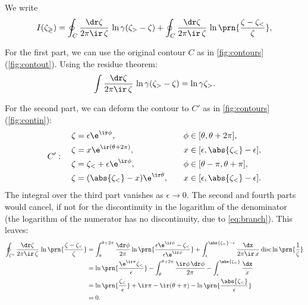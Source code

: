 \documentclass[12pt]{article}
\begin{document}
We write
%
\begin{equation}\label{eq:contoursplit}
  I(\zeta_\gtrless) = \oint_C \frac{\dr\zeta}{2\pi\ir\,\zeta}\, \ln\gamma(\zeta_>-\zeta) + \oint_C \frac{\dr\zeta}{2\pi\ir\,\zeta}\, \ln\prn{\frac{\zeta-\zeta_<}{\zeta}},
\end{equation}
%

For the first part, we can use the original contour $C$ as in \autoref{fig:contours}(\ref{fig:contout}).
Using the residue theorem:
%
\begin{equation}\label{eq:intout}
  \int \frac{\dr\zeta}{2\pi\ir\,\zeta}\, \ln\gamma(\zeta_>-\zeta) = \ln \gamma\zeta_>.
\end{equation}
%

For the second part, we can deform the contour to $C'$ as in \autoref{fig:contours}(\ref{fig:contin}):
%
\begin{equation}\label{eq:contout}
C': \quad
  \begin{aligned}
    \zeta &= \epsilon\e^{\ir\phi},                         & \phi &\in [\theta,\theta+2\pi], \\
    \zeta &= x \e^{\ir(\theta+2\pi)},                      & x    &\in [\epsilon,\abs{\zeta_<}-\epsilon], \\
    \zeta &= \zeta_< + \epsilon\e^{\ir\phi},               & \phi &\in [\theta-\pi,\theta+\pi], \\
    \zeta &= (\abs{\zeta_<}-x) \e^{\ir\theta},\quad & x    &\in [\epsilon,\abs{\zeta_<}-\epsilon]. \\
  \end{aligned}
\end{equation}
%
The integral over the third part vanishes as $\epsilon\to0$.
The second and fourth parts would cancel, if not for the discontinuity in the logarithm of the denominator
(the logarithm of the numerator has no discontinuity, due to \eqref{eq:branch}).
This leaves:
%
\begin{equation}\label{eq:intin}
\begin{aligned}
  \oint_{C'} \frac{\dr\zeta}{2\pi\ir\,\zeta}\, \ln\prn{\frac{\zeta-\zeta_<}{\zeta}}
    &= \int_{\theta}^{\theta+2\pi}\frac{\dr\phi}{2\pi} \ln\prn{\frac{\epsilon\e^{\ir\phi}-\zeta_<}{\epsilon\e^{\ir\phi}}}
     + \int_{\epsilon}^{\abs{\zeta_<}-\epsilon} \frac{\dx}{2\pi\ir\,x} \operatorname{disc}\ln\prn{\frac{1}{\zeta}}\\
    &= \ln\prn{\frac{\e^{\ir\pi}\zeta_<}{\epsilon}}
     -  \int_{\theta}^{\theta+2\pi} \frac{\ir\phi\,\dr\phi}{2\pi}
     - \int_{\epsilon}^{\abs{\zeta_<}} \frac{\dx}{x}\\
    &= \ln\prn{\frac{\zeta_<}{\epsilon}} +\ir\pi
     - \ir(\theta+\pi)
     - \ln\prn{\frac{\abs{\zeta_<}}{\epsilon}}\\
    &= 0.
\end{aligned}
\end{equation}
%
\end{document}
